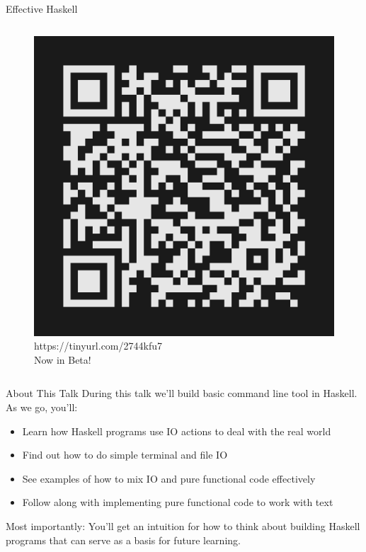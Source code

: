 \documentclass[10pt, presentation, colorlinks]{beamer}
\begin{document}
\begin{frame}[label={sec:org052d681}]{Effective Haskell}
\begin{columns}
\begin{column}[t]{0.45\columnwidth}
\begin{figure}[htbp]
\centering
\includegraphics[height=\textwidth]{img/effective-haskell-url.png}
{\tiny{https://tinyurl.com/2744kfu7\\ Now in Beta!}}
\end{figure}
\end{column}
\end{columns}
\end{frame}

\begin{frame}[label={sec:orgdc5eb13}]{About This Talk}
During this talk we'll build basic command line tool in Haskell. As we
go, you'll:

\bigskip

\begin{itemize}
\item Learn how Haskell programs use IO actions to deal with the real world
\item Find out how to do simple terminal and file IO
\item See examples of how to mix IO and pure functional code effectively
\item Follow along with implementing pure functional code to work with text
\end{itemize}

\bigskip

\alert{Most importantly}: You'll get an intuition for how to think about
building Haskell programs that can serve as a basis for future
learning.
\end{frame}
\end{document}
